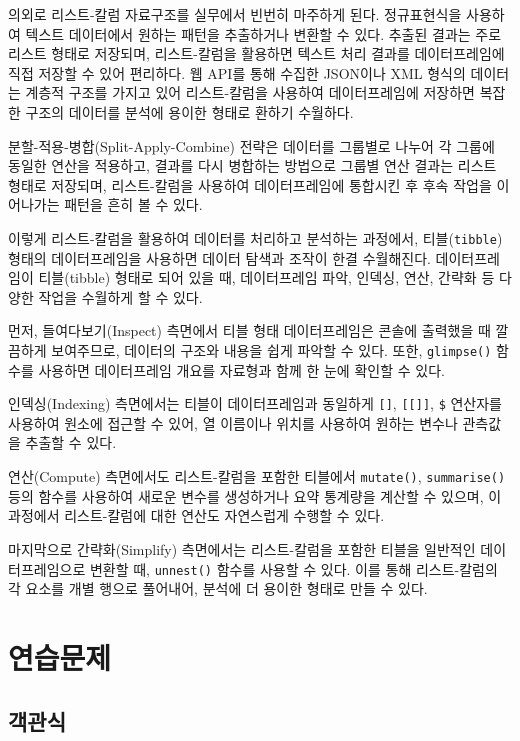 \documentclass[
  letterpaper,
]{book}
\begin{document}
의외로 리스트-칼럼 자료구조를 실무에서 빈번히 마주하게 된다.
정규표현식을 사용하여 텍스트 데이터에서 원하는 패턴을 추출하거나 변환할
수 있다. 추출된 결과는 주로 리스트 형태로 저장되며, 리스트-칼럼을
활용하면 텍스트 처리 결과를 데이터프레임에 직접 저장할 수 있어 편리하다.
웹 API를 통해 수집한 JSON이나 XML 형식의 데이터는 계층적 구조를 가지고
있어 리스트-칼럼을 사용하여 데이터프레임에 저장하면 복잡한 구조의
데이터를 분석에 용이한 형태로 환하기 수월하다.

분할-적용-병합(Split-Apply-Combine) 전략은 데이터를 그룹별로 나누어 각
그룹에 동일한 연산을 적용하고, 결과를 다시 병합하는 방법으로 그룹별 연산
결과는 리스트 형태로 저장되며, 리스트-칼럼을 사용하여 데이터프레임에
통합시킨 후 후속 작업을 이어나가는 패턴을 흔히 볼 수 있다.

이렇게 리스트-칼럼을 활용하여 데이터를 처리하고 분석하는 과정에서,
티블(\texttt{tibble}) 형태의 데이터프레임을 사용하면 데이터 탐색과
조작이 한결 수월해진다. 데이터프레임이 티블(tibble) 형태로 되어 있을 때,
데이터프레임 파악, 인덱싱, 연산, 간략화 등 다양한 작업을 수월하게 할 수
있다.

먼저, 들여다보기(Inspect) 측면에서 티블 형태 데이터프레임은 콘솔에
출력했을 때 깔끔하게 보여주므로, 데이터의 구조와 내용을 쉽게 파악할 수
있다. 또한, \texttt{glimpse()} 함수를 사용하면 데이터프레임 개요를
자료형과 함께 한 눈에 확인할 수 있다.

인덱싱(Indexing) 측면에서는 티블이 데이터프레임과 동일하게
\texttt{{[}{]}}, \texttt{{[}{[}{]}{]}}, \texttt{\$} 연산자를 사용하여
원소에 접근할 수 있어, 열 이름이나 위치를 사용하여 원하는 변수나
관측값을 추출할 수 있다.

연산(Compute) 측면에서도 리스트-칼럼을 포함한 티블에서
\texttt{mutate()}, \texttt{summarise()} 등의 함수를 사용하여 새로운
변수를 생성하거나 요약 통계량을 계산할 수 있으며, 이 과정에서
리스트-칼럼에 대한 연산도 자연스럽게 수행할 수 있다.

마지막으로 간략화(Simplify) 측면에서는 리스트-칼럼을 포함한 티블을
일반적인 데이터프레임으로 변환할 때, \texttt{unnest()} 함수를 사용할 수
있다. 이를 통해 리스트-칼럼의 각 요소를 개별 행으로 풀어내어, 분석에 더
용이한 형태로 만들 수 있다.

\section*{연습문제}\label{uxc5f0uxc2b5uxbb38uxc81c-3}


\subsection*{객관식}\label{uxac1duxad00uxc2dd}
\end{document}

